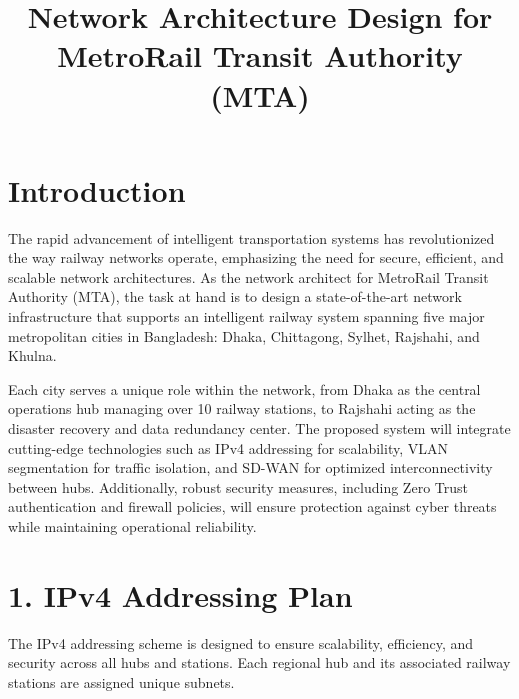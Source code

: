 \documentclass[12pt]{article}
\title{Network Architecture Design for MetroRail Transit Authority (MTA)}
\author{}
\date{}
\begin{document}
\maketitle

\section*{Introduction}
The rapid advancement of intelligent transportation systems has revolutionized the way railway networks operate, emphasizing the need for secure, efficient, and scalable network architectures. As the network architect for MetroRail Transit Authority (MTA), the task at hand is to design a state-of-the-art network infrastructure that supports an intelligent railway system spanning five major metropolitan cities in Bangladesh: Dhaka, Chittagong, Sylhet, Rajshahi, and Khulna.

Each city serves a unique role within the network, from Dhaka as the central operations hub managing over 10 railway stations, to Rajshahi acting as the disaster recovery and data redundancy center. The proposed system will integrate cutting-edge technologies such as IPv4 addressing for scalability, VLAN segmentation for traffic isolation, and SD-WAN for optimized interconnectivity between hubs. Additionally, robust security measures, including Zero Trust authentication and firewall policies, will ensure protection against cyber threats while maintaining operational reliability.
\section*{1. IPv4 Addressing Plan}

The IPv4 addressing scheme is designed to ensure scalability, efficiency, and security across all hubs and stations. Each regional hub and its associated railway stations are assigned unique subnets.
\end{document}
